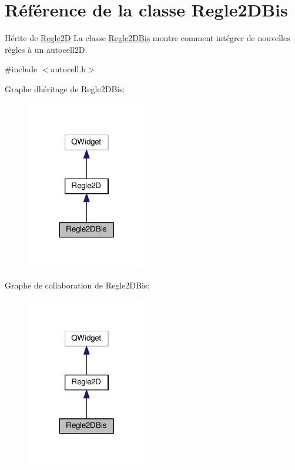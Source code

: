 \hypertarget{class_regle2_d_bis}{}\section{Référence de la classe Regle2\+D\+Bis}
\label{class_regle2_d_bis}


Hérite de \hyperlink{class_regle2_d}{Regle2D} La classe \hyperlink{class_regle2_d_bis}{Regle2\+D\+Bis} montre comment intégrer de nouvelles règles à un autocell2D.  




{\ttfamily \#include $<$autocell.\+h$>$}



Graphe d\textquotesingle{}héritage de Regle2\+D\+Bis\+:\nopagebreak
\begin{figure}[H]
\begin{center}
\leavevmode
\includegraphics[width=149pt]{class_regle2_d_bis__inherit__graph}
\end{center}
\end{figure}


Graphe de collaboration de Regle2\+D\+Bis\+:\nopagebreak
\begin{figure}[H]
\begin{center}
\leavevmode
\includegraphics[width=149pt]{class_regle2_d_bis__coll__graph}
\end{center}
\end{figure}
